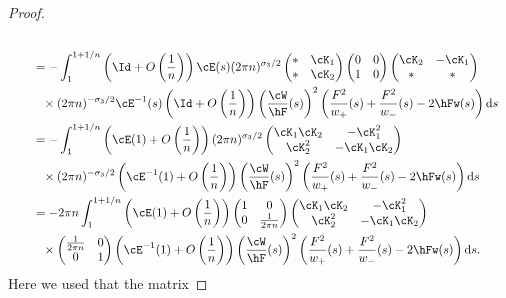 \begin{proof}
\begin{align}
 \\ &\qquad= - \int_1^{1+1/n} \left( \Id + O\left(\frac{1}{n}\right)\right)\cE(s)(2\pi n)^{\sigma_3/2}
 \begin{pmatrix}
 * & \cK_1
 \\
 * & \cK_2
 \end{pmatrix}
 \begin{pmatrix}
 0 & 0
 \\
 1 & 0
 \end{pmatrix} \begin{pmatrix}
 \cK_2 & -\cK_1
 \\
 * & *
 \end{pmatrix}\nonumber
 \\
 &\phantom{\qquad=}{}\times (2\pi n)^{-\sigma_3/2}\cE^{-1}(s) \left( \Id + O\left(\frac{1}{n}\right)\right) \left(\frac{\cW}{\hF}(s)\right)^2\left(\frac{F^2}{w_+}(s)+\frac{F^2}{w_-}(s)-2\hFw(s)\right) {\rm d}s\nonumber
 \\
 &\qquad= -\int_1^{1+1/n} \left( \cE(1) + O\left( \frac{1}{n} \right)\right)(2\pi n)^{\sigma_3/2}
 \begin{pmatrix}
 \cK_1\cK_2 & -\cK^2_1
 \\
 \cK^2_2 & -\cK_1\cK_2
 \end{pmatrix}\nonumber
 \\
 &\phantom{\qquad=}{}\times (2\pi n)^{-\sigma_3/2} \left( \cE^{-1}(1) + O\left( \frac{1}{n} \right)\right)\left(\frac{\cW}{\hF}(s)\right)^2\left(\frac{F^2}{w_+}(s)+\frac{F^2}{w_-}(s)-2\hFw(s)\right) {\rm d}s\nonumber
 \\
 &\qquad=- 2\pi n \int_1^{1+1/n} \left( \cE(1) + O\left( \frac{1}{n} \right)\right)
 \begin{pmatrix}
 1 & 0
 \\
 0 & \frac{1}{2\pi n}
 \end{pmatrix}
 \begin{pmatrix}
 \cK_1\cK_2 & -\cK^2_1
 \\
 \cK^2_2 & -\cK_1\cK_2
 \end{pmatrix} \label{veryLongEq}\\
 &\phantom{\qquad=}{}\times
 \begin{pmatrix}
 \frac{1}{2\pi n} & 0
 \\
 0 & 1
 \end{pmatrix}\left( \cE^{-1}(1) + O\left( \frac{1}{n} \right)\right)\left(\frac{\cW}{\hF}(s)\right)^2\left(\frac{F^2}{w_+}(s)+\frac{F^2}{w_-}(s)-2\hFw(s)\right) {\rm d}s.\nonumber
\end{align}
Here we used that the matrix \smash{$\left(\begin{smallmatrix}

\end{smallmatrix}}
\end{proof}
